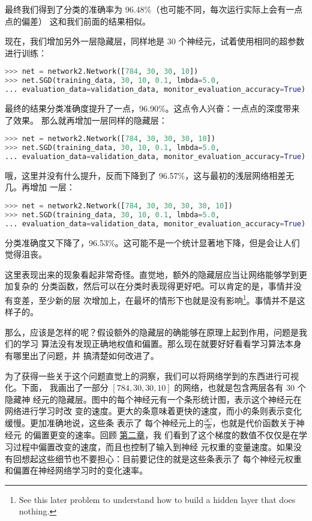 最终我们得到了分类的准确率为 96.48\%（也可能不同，每次运行实际上会有一点点的偏差）
这和我们前面的结果相似。

现在，我们增加另外一层隐藏层，同样地是 30 个神经元，试着使用相同的超参数进行训练：
\begin{lstlisting}[language=Python]
>>> net = network2.Network([784, 30, 30, 10]) 
>>> net.SGD(training_data, 30, 10, 0.1, lmbda=5.0,  
... evaluation_data=validation_data, monitor_evaluation_accuracy=True) 
\end{lstlisting}

最终的结果分类准确度提升了一点，96.90\%。这点令人兴奋：一点点的深度带来了效果。
那么就再增加一层同样的隐藏层：
\begin{lstlisting}[language=Python]
>>> net = network2.Network([784, 30, 30, 30, 10]) 
>>> net.SGD(training_data, 30, 10, 0.1, lmbda=5.0,  
... evaluation_data=validation_data, monitor_evaluation_accuracy=True) 
\end{lstlisting}

哦，这里并没有什么提升，反而下降到了 96.57\%，这与最初的浅层网络相差无几。再增加
一层：
\begin{lstlisting}[language=Python]
>>> net = network2.Network([784, 30, 30, 30, 30, 10]) 
>>> net.SGD(training_data, 30, 10, 0.1, lmbda=5.0,  
... evaluation_data=validation_data, monitor_evaluation_accuracy=True) 
\end{lstlisting}

分类准确度又下降了，96.53\%。这可能不是一个统计显著地下降，但是会让人们觉得沮丧。
 
这里表现出来的现象看起非常奇怪。直觉地，额外的隐藏层应当让网络能够学到更加复杂的
分类函数，然后可以在分类时表现得更好吧。可以肯定的是，事情并没有变差，至少新的层
次增加上，在最坏的情形下也就是没有影响\footnote{See this later problem to
  understand how to build a hidden layer that does nothing.}。事情并不是这样子的。
 
那么，应该是怎样的呢？假设额外的隐藏层的确能够在原理上起到作用，问题是我们的学习
算法没有发现正确地权值和偏置。那么现在就要好好看看学习算法本身有哪里出了问题，并
搞清楚如何改进了。
 
为了获得一些关于这个问题直觉上的洞察，我们可以将网络学到的东西进行可视化。下面，
我画出了一部分 $[784, 30, 30, 10]$ 的网络，也就是包含两层各有 $30$ 个隐藏神
经元的隐藏层。图中的每个神经元有一个条形统计图，表示这个神经元在网络进行学习时改
变的速度。更大的条意味着更快的速度，而小的条则表示变化缓慢。更加准确地说，这些条
表示了 每个神经元上的$\frac{\partial C}{\partial b}$，也就是代价函数关于神经元
的偏置更变的速率。回顾%
\hyperref[sec:the_four_fundamental_equations_behind_backpropagation]{第二章}，我
们看到了这个梯度的数值不仅仅是在学习过程中偏置改变的速度，而且也控制了输入到神经
元权重的变量速度。如果没有回想起这些细节也不要担心：目前要记住的就是这些条表示了
每个神经元权重和偏置在神经网络学习时的变化速率。
 
